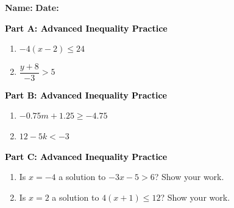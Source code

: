 \documentclass[12pt, letterpaper, fleqn]{article}
\begin{document}
\textbf{Name:} \underline{\hspace{5cm}}
\hfill
\textbf{Date:} \underline{\hspace{3cm}}\\

\begin{tcolorbox}[colback=customteal!20]
\large\textcolor{black}{\textbf{Part A: Advanced Inequality Practice}}
\end{tcolorbox}

\vspace{3mm}

\begin{enumerate}[itemsep=5.5cm, leftmargin=0.6cm]
\item $-4(x - 2) \le 24$
\item $\dfrac{y + 8}{-3} > 5$
\end{enumerate}

\newpage

\begin{tcolorbox}[colback=customteal!20]
\large\textcolor{black}{\textbf{Part B: Advanced Inequality Practice}}
\end{tcolorbox}

\vspace{3mm}

\begin{enumerate}[itemsep=5.5cm, leftmargin=0.6cm, resume]
\item $-0.75m + 1.25 \ge -4.75$
\item $12 - 5k < -3$
\end{enumerate}

\newpage

\begin{tcolorbox}[colback=customteal!20]
\large\textcolor{black}{\textbf{Part C: Advanced Inequality Practice}}
\end{tcolorbox}

\vspace{3mm}

\begin{enumerate}[itemsep=5.5cm, leftmargin=0.6cm, resume]
\item Is $x = -4$ a solution to $-3x - 5 > 6$? Show your work.
\item Is $x = 2$ a solution to $4(x + 1) \le 12$? Show your work.
\end{enumerate}
\end{document}
